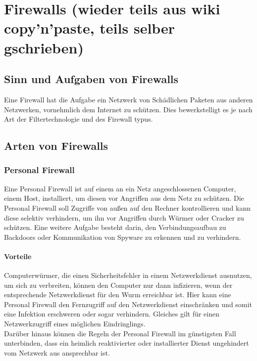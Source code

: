\chapter{Firewalls (wieder teils aus wiki copy'n'paste, teils selber gschrieben)}
\section{Sinn und Aufgaben von Firewalls}
Eine Firewall hat die Aufgabe ein Netzwerk von Schädlichen Paketen aus anderen Netzwerken, vornehmlich dem Internet zu schützen. Dies bewerkstelligt es je nach Art der Filtertechnologie und des Firewall typus.
\section{Arten von Firewalls}
\subsection{Personal Firewall}
Eine Personal Firewall ist auf einem an ein Netz angeschlossenen Computer, einem Host, installiert, um diesen vor Angriffen aus dem Netz zu schützen. Die Personal Firewall soll Zugriffe von außen auf den Rechner kontrollieren und kann diese selektiv verhindern, um ihn vor Angriffen durch Würmer oder Cracker zu schützen. Eine weitere Aufgabe besteht darin, den Verbindungsaufbau zu Backdoors oder Kommunikation von Spyware zu erkennen und zu verhindern.\\
\subsubsection{Vorteile}
Computerwürmer, die einen Sicherheitsfehler in einem Netzwerkdienst ausnutzen, um sich zu verbreiten, können den Computer nur dann infizieren, wenn der entsprechende Netzwerkdienst für den Wurm erreichbar ist. Hier kann eine Personal Firewall den Fernzugriff auf den Netzwerkdienst einschränken und somit eine Infektion erschweren oder sogar verhindern. Gleiches gilt für einen Netzwerkzugriff eines möglichen Eindringlings.\\
Darüber hinaus können die Regeln der Personal Firewall im günstigsten Fall unterbinden, dass ein heimlich reaktivierter oder installierter Dienst ungehindert vom Netzwerk aus ansprechbar ist.
